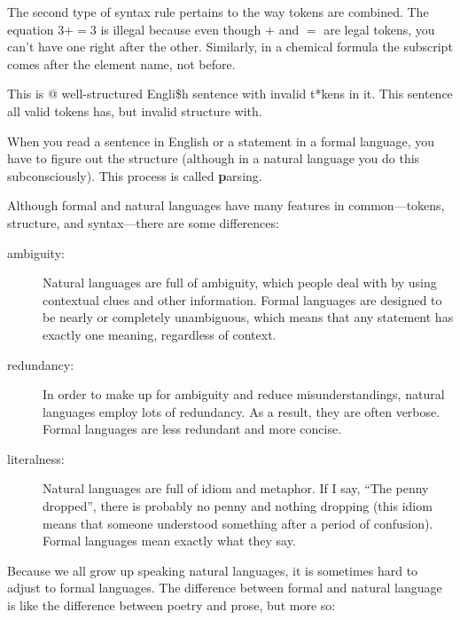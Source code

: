 \documentclass[
DIV=11,
fontsize=13,
twoside,
headinclude=false,
titlepage=firstiscover,
abstract=true,
headsepline=true,
footsepline=true,
chapterprefix=true, %
headings=big,
bibliography=totoc,%
captions=tableheading
]{scrbook}
\theoremstyle{definition}
\begin{document}
The second type of syntax rule pertains to the way tokens are
combined.  The equation $3 += 3$ is illegal because even though $+$
and $=$ are legal tokens, you can't have one right after the other.
Similarly, in a chemical formula the subscript comes after the element
name, not before.

This is @ well-structured Engli\$h
sentence with invalid t*kens in it.  This sentence all valid tokens
has, but invalid structure with.

When you read a sentence in English or a statement in a formal
language, you have to figure out the structure
(although in a natural language you do this subconsciously).  This
process is called {\textbf parsing}.

Although formal and natural languages have many features in
common---tokens, structure, and syntax---there are some
differences:

\begin{description}

\item[ambiguity:] Natural languages are full of ambiguity, which
people deal with by using contextual clues and other information.
Formal languages are designed to be nearly or completely unambiguous,
which means that any statement has exactly one meaning,
regardless of context.

\item[redundancy:] In order to make up for ambiguity and reduce
misunderstandings, natural languages employ lots of
redundancy.  As a result, they are often verbose.  Formal languages
are less redundant and more concise.

\item[literalness:] Natural languages are full of idiom and metaphor.
If I say, ``The penny dropped'', there is probably no penny and
nothing dropping (this idiom means that someone understood something
after a period of confusion).  Formal languages
mean exactly what they say.

\end{description}

Because we all grow up speaking natural languages, it is sometimes
hard to adjust to formal languages.  The difference between formal and
natural language is like the difference between poetry and prose, but
more so:  
\end{document}
